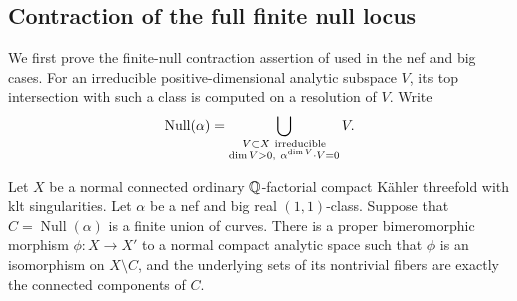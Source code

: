 \subsection{Contraction of the full finite null locus}

We first prove the finite-null contraction assertion of
\cite[Proposition~6.2]{DasHacon2024} used in the nef and big cases.
For an irreducible positive-dimensional analytic subspace \(V\), its top
intersection with such a class is computed on a resolution of \(V\).
Write
\[
 \operatorname{Null}(\alpha)=
 \bigcup_{\substack{V\subset X\ {\rm irreducible}\\
                     \dim V>0,\ \alpha^{\dim V}\cdot V=0}} V .
\]
\begin{proposition}\label{prop:finite-null}
Let \(X\) be a normal connected ordinary \(\mathbb Q\)-factorial compact
K\"ahler threefold with klt singularities.  Let \(\alpha\) be a nef and
big real \((1,1)\)-class.  Suppose that
\(C=\operatorname{Null}(\alpha)\) is a finite union of curves.  There is
a proper bimeromorphic morphism \(\phi:X\to X'\) to a normal compact
analytic space such that \(\phi\) is an isomorphism on \(X\setminus C\),
and the underlying sets of its nontrivial fibers are exactly the
connected components of \(C\).
\end{proposition}
